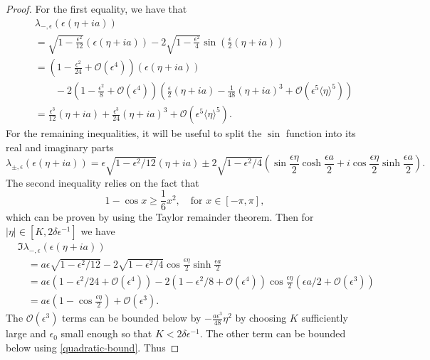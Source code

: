 \begin{proof}
	For the first equality, we have that 
	\begin{align*}
		&\lambda_{-,\epsilon} (\epsilon(\eta + ia))  \\
		\quad&= \sqrt{1-\frac{\epsilon^2}{12}} (\epsilon(\eta + ia)) - 2 \sqrt{1 - \frac{\epsilon^2} 4}\sin\left(\frac \epsilon 2 (\eta + ia ) \right) \\
		\quad&=\left( 1 - \frac{\epsilon^2}{24} +\mathcal O(\epsilon^4) \right) (\epsilon(\eta + ia )) \\
		&\qquad - 2 \left( 1 - \frac{\epsilon^2} 8 + \mathcal O(\epsilon^4) \right) \left( \frac\epsilon 2 (\eta+ i a) - \frac 1 {48}  (\eta + ia)^3 + \mathcal O(\epsilon^5\langle\eta \rangle^5)\right) \\
		\quad&= \frac {\epsilon^3} {12} (\eta + ia) + \frac{\epsilon^3}{24}(\eta + ia)^3 + \mathcal O(\epsilon^5 \langle \eta\rangle^5).
	\end{align*}
	For the remaining inequalities, it will be useful to split the \(\sin\) function into its real and imaginary parts
	\begin{equation*} 
		\lambda_{\pm,\epsilon}(\epsilon (\eta + ia)) = \epsilon \sqrt{1-\epsilon^2/12}(\eta+ia) \pm 2 \sqrt{1-\epsilon^2/4} \left(\sin \frac{\epsilon \eta}{2} \cosh\frac{\epsilon a}{2} + i\cos \frac{\epsilon \eta}{2} \sinh \frac{\epsilon a}{2}\right).
	\end{equation*} 
	The second inequality relies on the fact that 
	\begin{equation}\label{quadratic-bound}
		1- \cos x  \geq  \frac 1  6 x^2, \quad \text{for } x\in[-\pi, \pi],
	\end{equation}
	which can be proven by using the Taylor remainder theorem. Then for \(|\eta|\in [K,2\delta \epsilon^{-1}] \) we have
	\begin{align*}
		&\Im \lambda_{-,\epsilon}(\epsilon(\eta + ia))\\
		&\quad= a\epsilon \sqrt{1-\epsilon^2/12} - 2 \sqrt{1-\epsilon^2/4} \cos\frac{\epsilon\eta} 2 \sinh \frac{\epsilon a} 2 \\
		&\quad= a\epsilon (1 - \epsilon^2/24 + \mathcal{O}(\epsilon^4))- 2 (1 - \epsilon^2/8 + \mathcal{O}(\epsilon^4)) \cos\frac{\epsilon\eta} 2 (\epsilon a/2 + \mathcal O(\epsilon^3))\\
		&\quad= a \epsilon (1- \cos \frac{\epsilon \eta} 2 ) + \mathcal O(\epsilon^3).
	\end{align*}
	The \(\mathcal O(\epsilon ^3)\) terms can be bounded below by \(-\frac{a\epsilon^3}{48}\eta^2\) by choosing \(K\) sufficiently large and \(\epsilon_0\) small enough so that \(K < 2\delta \epsilon^{-1}\). The other term can be bounded below using \cref{quadratic-bound}. Thus

\end{proof}
